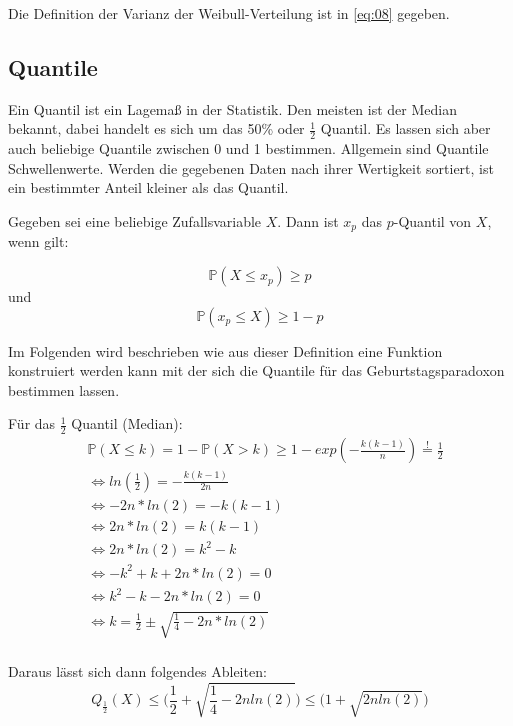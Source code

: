 \documentclass[../main.tex]{subfiles}
\begin{document}
\begin{flushleft}
Die Definition der Varianz der Weibull-Verteilung ist in \autoref{eq:08} gegeben.

 \subsection{Quantile}

Ein Quantil ist ein Lagemaß in der Statistik. Den meisten ist der Median bekannt, dabei handelt es sich um das 50\% oder $\frac{1}{2}$ Quantil. Es lassen sich aber auch beliebige Quantile zwischen 0 und 1 bestimmen. Allgemein sind Quantile Schwellenwerte. Werden die gegebenen Daten nach ihrer Wertigkeit sortiert, ist ein bestimmter Anteil kleiner als das Quantil. \newline

Gegeben sei eine beliebige Zufallsvariable $X$. Dann ist $x_{p}$ das $p$-Quantil von $X$, wenn gilt:

\begin{equation}
\mathbb{P}(X \leq x_p) \geq p
\end{equation}
und
\begin{equation}
\mathbb{P}( x_p \leq X ) \geq 1- p
\end{equation}

Im Folgenden wird beschrieben wie aus dieser Definition eine Funktion konstruiert werden kann mit der sich die Quantile für das Geburtstagsparadoxon bestimmen lassen. \newline

Für das  $\frac{1}{2}$ Quantil (Median):
\begin{align*}
& \mathbb{P}(X \leq k) = 1 - \mathbb{P}(X > k) \geq 1 - exp(-\frac{ k(k-1) }{ n }) \overset{!}{=} \frac{ 1 }{ 2 } \\
& \Leftrightarrow ln(\frac{ 1 }{ 2 }) = -\frac{ k(k-1)}{ 2n } \\
& \Leftrightarrow -2n*ln(2) = -k(k-1) \\
& \Leftrightarrow 2n*ln(2) = k(k-1) \\
& \Leftrightarrow 2n*ln(2) = k^{2} - k \\
& \Leftrightarrow - k^{2} + k + 2n*ln(2) = 0 \\
& \Leftrightarrow k^{2} - k - 2n*ln(2) = 0 \\
& \Leftrightarrow k = \frac{ 1 }{ 2 } \pm \sqrt{ \frac{ 1 }{ 4 } - 2n*ln(2)} \\
\end{align*}

Daraus lässt sich dann folgendes Ableiten:
\begin{equation}
Q_{ \frac{ 1 }{ 2 } }(X) \leq \bigg( \frac{ 1 }{ 2 } + \sqrt{ \frac{ 1 }{ 4 } - 2nln(2)} \bigg) \leq \bigg(1+\sqrt{ 2nln(2) }\bigg)
\end{equation}
\newline


\end{flushleft}
\end{document}
